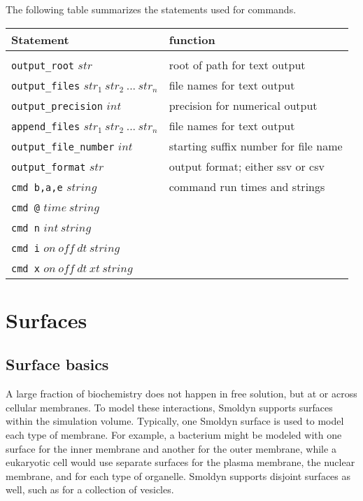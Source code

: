 \documentclass {scrbook}
\newcommand {\ttt} {\texttt}
\begin{document}
The following table summarizes the statements used for commands.

\begin{longtable}[c]{ll}
Statement & function\\
\hline\\
\ttt{output\_root} $str$ & root of path for text output\\
\ttt{output\_files} $str_1\ str_2\ ...\ str_n$ & file names for text output\\
\ttt{output\_precision} $int$ & precision for numerical output\\
\ttt{append\_files} $str_1\ str_2\ ...\ str_n$ & file names for text output\\
\ttt{output\_file\_number} $int$ & starting suffix number for file name\\
\ttt{output\_format} $str$ & output format; either ssv or csv\\
\ttt{cmd b,a,e} $string$ & command run times and strings\\
\ttt{cmd @} $time\ string$\\
\ttt{cmd n} $int\ string$\\
\ttt{cmd i} $on\ off\ dt\ string$\\
\ttt{cmd x} $on\ off\ dt\ xt\ string$
\end{longtable}


\chapter{Surfaces}

\section{Surface basics}

A large fraction of biochemistry does not happen in free solution, but at or across cellular membranes. To model these interactions, Smoldyn supports surfaces within the simulation volume. Typically, one Smoldyn surface is used to model each type of membrane. For example, a bacterium might be modeled with one surface for the inner membrane and another for the outer membrane, while a eukaryotic cell would use separate surfaces for the plasma membrane, the nuclear membrane, and for each type of organelle. Smoldyn supports disjoint surfaces as well, such as for a collection of vesicles.
\end{document}
